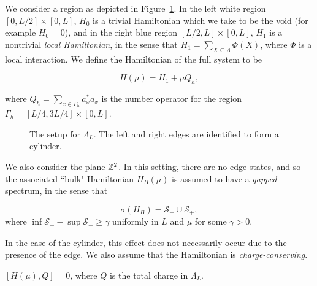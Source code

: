 \documentclass[12pt, letterpaper]{article}
\begin{document}
We consider a region as depicted in Figure~\ref{fig:setup}. In the left white region $[0,L/2] \times [0,L]$, $H_0$ is a trivial Hamiltonian which we take to be the void (for example $H_0=0$), and in the right blue region $[L/2,L]\times [0,L]$, $H_1$ is a nontrivial \textit{local Hamiltonian}, in the sense that $H_1 = \sum_{X \subseteq \Lambda} \Phi(X)$, where $\Phi$ is a local interaction. We define the Hamiltonian of the full system to be 

\[H(\mu) = H_1 + \mu Q_h,\]

where $Q_h = \sum_{x \in \Gamma_h} a_x^*a_x$ is the number operator for the region $\Gamma_h = [L/4,3L/4] \times [0,L]$. 

\begin{figure}[h!]
\centering
{}
\caption{The setup for $\Lambda_L$. The left and right edges are identified to form a cylinder.}
\label{fig:setup}
\end{figure}

We also consider the plane $\mathbb{Z}^2$. In this setting, there are no edge states, and so the associated ``bulk" Hamiltonian $H_B(\mu)$ is assumed to have a \textit{gapped} spectrum, in the sense that

\begin{assumption}
\[\sigma(H_B) = \mathcal{S}_{-} \cup \mathcal{S}_{+},\]
where $\inf\mathcal{S}_{+} - \sup \mathcal{S}_{-} \geq \gamma$ uniformly in $L$ and $\mu$ for some $\gamma > 0$. 
\label{ass:gap}
\end{assumption}

In the case of the cylinder, this effect does not necessarily occur due to the presence of the edge. 
We also assume that the Hamiltonian is \emph{charge-conserving}.

\begin{assumption}
$[H(\mu), Q] = 0$, where $Q$ is the total charge in $\Lambda_L$.
\label{ass:charge}
\end{assumption}
\end{document}
